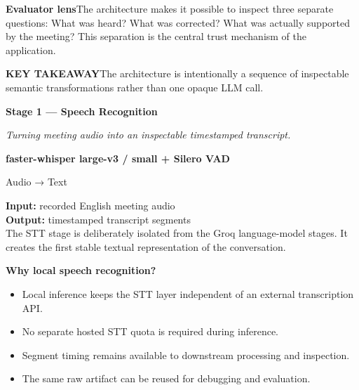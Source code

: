 \documentclass[9pt,a4paper]{extarticle}
\newcommand{\tagline}[1]{{\large\color{charcoal}\itshape #1\par}}
\begin{document}
\vspace{4pt}
\begin{card}
\textbf{Evaluator lens}\quad The architecture makes it possible to inspect three separate questions: What was heard? What was corrected? What was actually supported by the meeting? This separation is the central trust mechanism of the application.
\end{card}

\vspace{4pt}
\begin{notecard}\textbf{KEY TAKEAWAY}\quad The architecture is intentionally a sequence of inspectable semantic transformations rather than one opaque LLM call.
\end{notecard}
\newpage

{\fontsize{22}{25}\selectfont\bfseries Stage 1 — Speech Recognition\par}
\tagline{Turning meeting audio into an inspectable timestamped transcript.}
\vspace{4pt}

\begin{minipage}[t]{0.47\textwidth}
\vspace{0pt}
\begin{darkcard}\centering\textbf{faster-whisper large-v3 / small + Silero VAD}\par\vspace{1pt}\scriptsize Audio → Text\end{darkcard}
\begin{card}
\textbf{Input:} recorded English meeting audio\\
\textbf{Output:} timestamped transcript segments\\[2pt]
The STT stage is deliberately isolated from the Groq language-model stages. It creates the first stable textual representation of the conversation.
\end{card}
\end{minipage}\hfill
\begin{minipage}[t]{0.50\textwidth}
\vspace{0pt}
\begin{card}
\textbf{Why local speech recognition?}
\begin{itemize}
\item Local inference keeps the STT layer independent of an external transcription API.
\item No separate hosted STT quota is required during inference.
\item Segment timing remains available to downstream processing and inspection.
\item The same raw artifact can be reused for debugging and evaluation.
\end{itemize}
\end{card}
\end{minipage}
\end{document}
